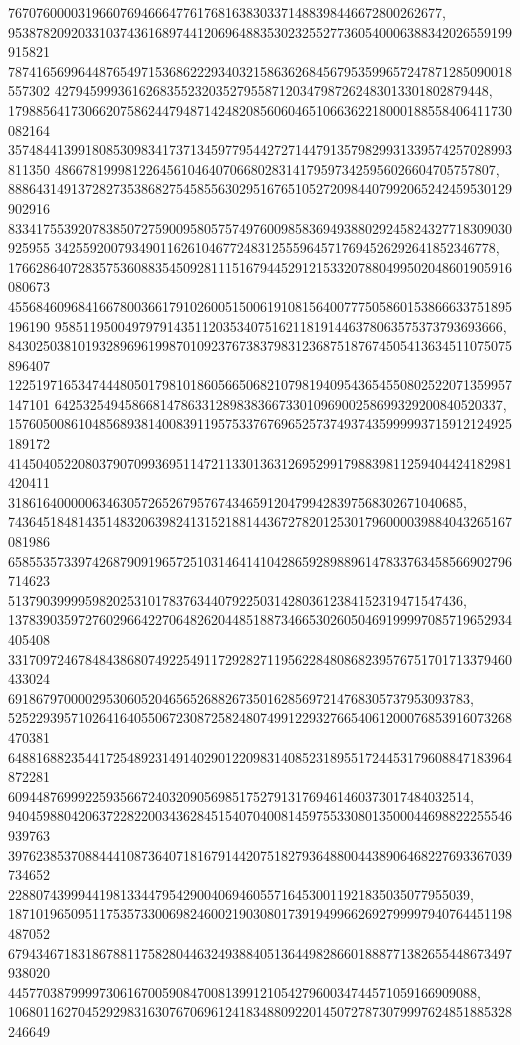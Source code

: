 \documentclass[12pt]{article}
\begin{document}
76707600003196607694666477617681638303371488398446672800262677, 
953878209203310374361689744120696488353023255277360540006388342026559199915821
787416569964487654971536862229340321586362684567953599657247871285090018557302
42794599936162683552320352795587120347987262483013301802879448, 
179885641730662075862447948714248208560604651066362218000188558406411730082164
357484413991808530983417371345977954427271447913579829931339574257028993811350
486678199981226456104640706680283141795973425956026604705757807, 
888643149137282735386827545855630295167651052720984407992065242459530129902916
833417553920783850727590095805757497600985836949388029245824327718309030925955
342559200793490116261046772483125559645717694526292641852346778, 
176628640728357536088354509281115167944529121533207880499502048601905916080673
455684609684166780036617910260051500619108156400777505860153866633751895196190
9585119500497979143511203534075162118191446378063575373793693666, 
843025038101932896961998701092376738379831236875187674505413634511075075896407
122519716534744480501798101860566506821079819409543654550802522071359957147101
6425325494586681478633128983836673301096900258699329200840520337, 
157605008610485689381400839119575337676965257374937435999993715912124925189172
414504052208037907099369511472113301363126952991798839811259404424182981420411
31861640000063463057265267957674346591204799428397568302671040685, 
743645184814351483206398241315218814436727820125301796000039884043265167081986
658553573397426879091965725103146414104286592898896147833763458566902796714623
51379039999598202531017837634407922503142803612384152319471547436, 
137839035972760296642270648262044851887346653026050469199997085719652934405408
331709724678484386807492254911729282711956228480868239576751701713379460433024
691867970000295306052046565268826735016285697214768305737953093783, 
525229395710264164055067230872582480749912293276654061200076853916073268470381
648816882354417254892314914029012209831408523189551724453179608847183964872281
609448769992259356672403209056985175279131769461460373017484032514, 
940459880420637228220034362845154070400814597553308013500044698822255546939763
397623853708844410873640718167914420751827936488004438906468227693367039734652
228807439994419813344795429004069460557164530011921835035077955039, 
187101965095117535733006982460021903080173919499662692799997940764451198487052
679434671831867881175828044632493884051364498286601888771382655448673497938020
4457703879999730616700590847008139912105427960034744571059166909088, 
106801162704529298316307670696124183488092201450727873079997624851885328246649
\end{document}
